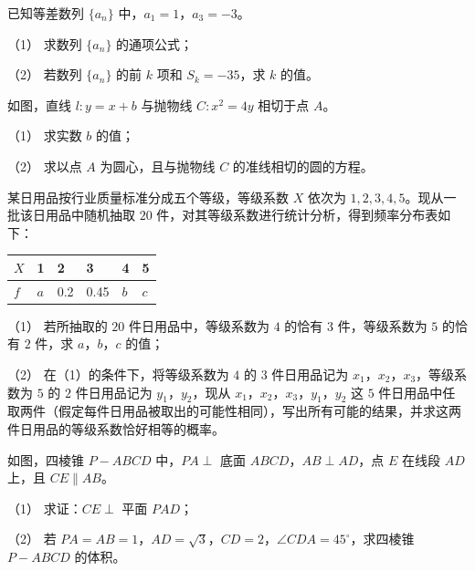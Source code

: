 \begin{question}
已知等差数列 $\{a_n\}$ 中，$a_1=1$，$a_3=-3$。

（1） 求数列 $\{a_n\}$ 的通项公式；

（2） 若数列 $\{a_n\}$ 的前 $k$ 项和 $S_k=-35$，求 $k$ 的值。

\Needspace{0.4\textheight}
\end{question}
\begin{question}
如图，直线 $l:y=x+b$ 与抛物线 $C:x^2=4y$ 相切于点 $A$。

（1） 求实数 $b$ 的值；

（2） 求以点 $A$ 为圆心，且与抛物线 $C$ 的准线相切的圆的方程。
\nopagebreak[4]
\begin{center}\end{center}
\nopagebreak[4]
\end{question}
\begin{question}
某日用品按行业质量标准分成五个等级，等级系数 $X$ 依次为 $1,2,3,4,5$。现从一批该日用品中随机抽取 $20$ 件，对其等级系数进行统计分析，得到频率分布表如下：

\begin{center}
\begin{tabular}{llllll}
\toprule
$X$ & 1 & 2 & 3 & 4 & 5 \\
\midrule
$f$ & $a$ & 0.2 & 0.45 & $b$ & $c$ \\
\bottomrule
\end{tabular}
\end{center}

（1） 若所抽取的 $20$ 件日用品中，等级系数为 $4$ 的恰有 $3$ 件，等级系数为 $5$ 的恰有 $2$ 件，求 $a$，$b$，$c$ 的值；

（2） 在（1）的条件下，将等级系数为 $4$ 的 $3$ 件日用品记为 $x_1$，$x_2$，$x_3$，等级系数为 $5$ 的 $2$ 件日用品记为 $y_1$，$y_2$，现从 $x_1$，$x_2$，$x_3$，$y_1$，$y_2$ 这 $5$ 件日用品中任取两件（假定每件日用品被取出的可能性相同），写出所有可能的结果，并求这两件日用品的等级系数恰好相等的概率。

\Needspace{0.4\textheight}
\end{question}
\begin{question}
如图，四棱锥 $P-ABCD$ 中，$PA\perp$ 底面 $ABCD$，$AB\perp AD$，点 $E$ 在线段 $AD$ 上，且 $CE\parallel AB$。

（1） 求证：$CE\perp$ 平面 $PAD$；

（2） 若 $PA=AB=1$，$AD=\sqrt3$，$CD=2$，$\angle CDA=45^\circ$，求四棱锥 $P-ABCD$ 的体积。
\nopagebreak[4]
\begin{center}\end{center}
\nopagebreak[4]
\end{question}
